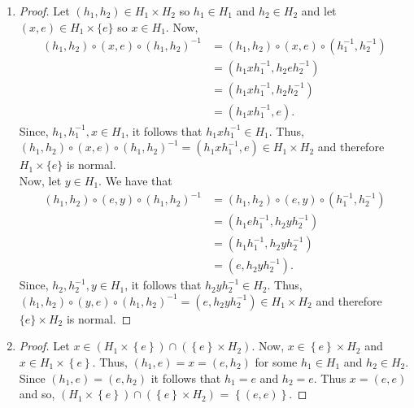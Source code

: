 \documentclass[12pt]{article}
\begin{document}
    \begin{enumerate}[label=\alph*)]
        \item \begin{proof}
            Let \((h_1, h_2)\in H_1\times H_2\) so \(h_1\in H_1\) and \(h_2 \in H_2\) and let \((x, e) \in H_1\times\{e\}\) so \(x\in H_1\). Now, 
            \begin{equation*}
                \begin{split}
                    (h_1, h_2)\circ(x, e)\circ(h_1, h_2)^{-1} &= (h_1, h_2)\circ(x, e)\circ(h_1^{-1}, h_2^{-1})\\
                    &= (h_1xh_1^{-1}, h_2eh_2^{-1})\\
                    &= (h_1xh_1^{-1}, h_2h_2^{-1})\\
                    &=(h_1xh_1^{-1}, e).
                \end{split}
            \end{equation*}
            Since, \(h_1, h_1^{-1}, x\in H_1\), it follows that \(h_1xh_1^{-1}\in H_1\). Thus, \((h_1, h_2)\circ(x, e)\circ(h_1, h_2)^{-1} = (h_1xh_1^{-1}, e)\in H_1\times H_2\) and therefore \(H_1\times \{e\}\) is normal. \\
            Now, let \(y\in H_1\). We have that
            \begin{equation*}
                \begin{split}
                    (h_1, h_2)\circ(e, y)\circ(h_1, h_2)^{-1} &= (h_1, h_2)\circ(e, y)\circ(h_1^{-1}, h_2^{-1})\\
                    &= (h_1eh_1^{-1}, h_2yh_2^{-1})\\
                    &= (h_1h_1^{-1}, h_2yh_2^{-1})\\
                    &=(e, h_2yh_2^{-1}).
                \end{split}
            \end{equation*}
            Since, \(h_2, h_2^{-1}, y\in H_1\), it follows that \(h_2yh_2^{-1}\in H_2\). Thus, \((h_1, h_2)\circ(y, e)\circ(h_1, h_2)^{-1} = (e, h_2yh_2^{-1})\in H_1\times H_2\) and therefore \(\{e\}\times H_2\) is normal. 
        \end{proof}
        \item \begin{proof}
            Let \(x \in (H_1\times \left\{ e \right\}) \cap (\left\{ e \right\}\times H_2)\). Now, \(x \in \left\{ e \right\}\times H_2\) and \(x \in H_1\times \left\{ e \right\}\). Thus, \((h_1, e) = x = (e, h_2)\) for some \(h_1\in H_1\) and \(h_2\in H_2\). Since \((h_1, e) = (e, h_2)\) it follows that \(h_1 = e\) and \(h_2 = e\). Thus \(x = (e, e)\) and so, \((H_1\times \left\{ e \right\}) \cap (\left\{ e \right\}\times H_2)\) = \(\left\{ (e,e) \right\}\).

\end{proof}
\end{enumerate}
\end{document}
